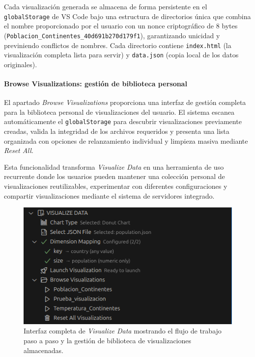 \documentclass[a4paper, 12pt]{book}
\begin{document}
Cada visualización generada se almacena de forma persistente en el \texttt{globalStorage} de VS Code bajo una estructura de directorios única que combina el nombre proporcionado por el usuario con un nonce criptográfico de 8 bytes (\texttt{Poblacion\_Continentes\_40d691b270d179f1}), garantizando unicidad y previniendo conflictos de nombres. Cada directorio contiene \texttt{index.html} (la visualización completa lista para servir) y \texttt{data.json} (copia local de los datos originales).

\paragraph{Browse Visualizations: gestión de biblioteca personal}
El apartado \emph{Browse Visualizations} proporciona una interfaz de gestión completa para la biblioteca personal de visualizaciones del usuario. El sistema escanea automáticamente el \texttt{globalStorage} para descubrir visualizaciones previamente creadas, valida la integridad de los archivos requeridos y presenta una lista organizada con opciones de relanzamiento individual y limpieza masiva mediante \emph{Reset All}.

Esta funcionalidad transforma \emph{Visualize Data} en una herramienta de uso recurrente donde los usuarios pueden mantener una colección personal de visualizaciones reutilizables, experimentar con diferentes configuraciones y compartir visualizaciones mediante el sistema de servidores integrado.

\begin{figure}[H]
\centering
\includegraphics[width=0.70\linewidth]{img/ui-visualize-data.png}
\caption{Interfaz completa de \emph{Visualize Data} mostrando el flujo de trabajo paso a paso y la gestión de biblioteca de visualizaciones almacenadas.}
\label{fig:ui-visualize-data}
\end{figure}
\end{document}
